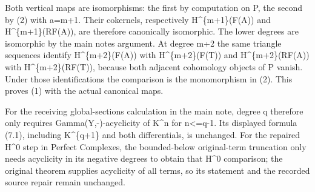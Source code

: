 Both vertical maps are isomorphisms:\allowbreak{} the first by computation on P,\allowbreak{} the second by (2)\allowbreak{} with a\allowbreak{}=m\allowbreak{}+1. Their cokernels,\allowbreak{} respectively H\textasciicircum{}\{m\allowbreak{}+1\}(F(A)\allowbreak{})\allowbreak{} and H\textasciicircum{}\{m\allowbreak{}+1\}(RF(A)\allowbreak{})\allowbreak{},\allowbreak{} are therefore canonically isomorphic. The lower degrees are isomorphic by the main note\textquotesingle s argument. At degree m\allowbreak{}+2 the same triangle sequences identify H\textasciicircum{}\{m\allowbreak{}+2\}(F(A)\allowbreak{})\allowbreak{} with H\textasciicircum{}\{m\allowbreak{}+2\}(F(T)\allowbreak{})\allowbreak{} and H\textasciicircum{}\{m\allowbreak{}+2\}(RF(A)\allowbreak{})\allowbreak{} with H\textasciicircum{}\{m\allowbreak{}+2\}(RF(T)\allowbreak{})\allowbreak{},\allowbreak{} because both adjacent cohomology objects of P vanish. Under those identifications the comparison is the monomorphism in (2)\allowbreak{}. This proves (1)\allowbreak{} with the actual canonical maps.

For the receiving global-sections calculation in the main note,\allowbreak{} degree q therefore only requires Gamma(Y,\allowbreak{}-)\allowbreak{}-acyclicity of K\^{}n for n<\allowbreak{}=q-1. Its displayed formula (7.1)\allowbreak{},\allowbreak{} including K\textasciicircum{}\{q\allowbreak{}+1\} and both differentials,\allowbreak{} is unchanged. For the repaired H\^{}0 step in Perfect Complexes,\allowbreak{} the bounded-below original-term truncation only needs acyclicity in its negative degrees to obtain that H\^{}0 comparison; the original theorem supplies acyclicity of all terms,\allowbreak{} so its statement and the recorded source repair remain unchanged.
